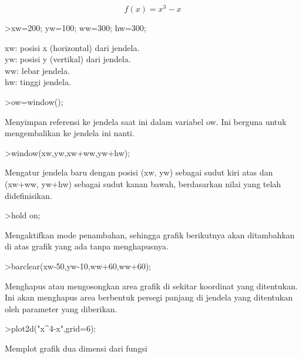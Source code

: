 \documentclass[a4paper,10pt]{article}
\begin{document}
\begin{eulernotebook}
\begin{eulercomment}
\end{eulercomment}
\begin{eulerformula}
\[
f(x)= x^{3}-x
\]
\end{eulerformula}
\begin{eulerprompt}
>xw=200; yw=100; ww=300; hw=300;
\end{eulerprompt}
\begin{eulercomment}
xw: posisi x (horizontal) dari jendela.\\
yw: posisi y (vertikal) dari jendela.\\
ww: lebar jendela.\\
hw: tinggi jendela.
\end{eulercomment}
\begin{eulerprompt}
>ow=window();
\end{eulerprompt}
\begin{eulercomment}
Menyimpan referensi ke jendela saat ini dalam variabel ow. Ini berguna
untuk mengembalikan ke jendela ini nanti.
\end{eulercomment}
\begin{eulerprompt}
>window(xw,yw,xw+ww,yw+hw);
\end{eulerprompt}
\begin{eulercomment}
Mengatur jendela baru dengan posisi (xw, yw) sebagai sudut kiri atas
dan (xw+ww, yw+hw) sebagai sudut kanan bawah, berdasarkan nilai yang
telah didefinisikan.
\end{eulercomment}
\begin{eulerprompt}
>hold on;
\end{eulerprompt}
\begin{eulercomment}
Mengaktifkan mode penambahan, sehingga grafik berikutnya akan
ditambahkan di atas grafik yang ada tanpa menghapusnya.
\end{eulercomment}
\begin{eulerprompt}
>barclear(xw-50,yw-10,ww+60,ww+60);
\end{eulerprompt}
\begin{eulercomment}
Menghapus atau mengosongkan area grafik di sekitar koordinat yang
ditentukan. Ini akan menghapus area berbentuk persegi panjang di
jendela yang ditentukan oleh parameter yang diberikan.
\end{eulercomment}
\begin{eulerprompt}
>plot2d("x^4-x",grid=6):
\end{eulerprompt}
\begin{eulercomment}
Memplot grafik dua dimensi dari fungsi\\

\end{eulercomment}
\end{eulernotebook}
\end{document}
